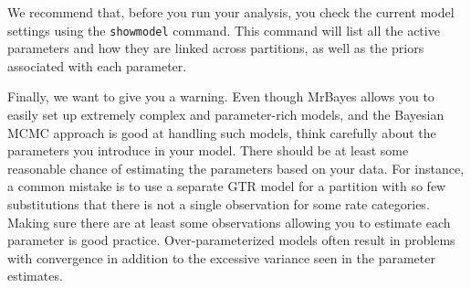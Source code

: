 \documentclass[12pt]{book}
\newcommand{\ttt}[1]{\texttt{#1}}
\begin{document}
We recommend that, before you run your analysis, you check the current model settings using the
\ttt{showmodel} command. This command will list all the active parameters and how they are linked
across partitions, as well as the priors associated with each parameter.

Finally, we want to give you a warning. Even though MrBayes allows you to easily set up extremely
complex and parameter-rich models, and the Bayesian MCMC approach is good at handling such models,
think carefully about the parameters you introduce in your model. There should be at least some
reasonable chance of estimating the parameters based on your data. For instance, a common mistake
is to use a separate GTR model for a partition with so few substitutions that there is not a single
observation for some rate categories. Making sure there are at least some observations allowing you
to estimate each parameter is good practice. Over-parameterized models often result in problems
with convergence in addition to the excessive variance seen in the parameter estimates.

\appendix
\end{document}
